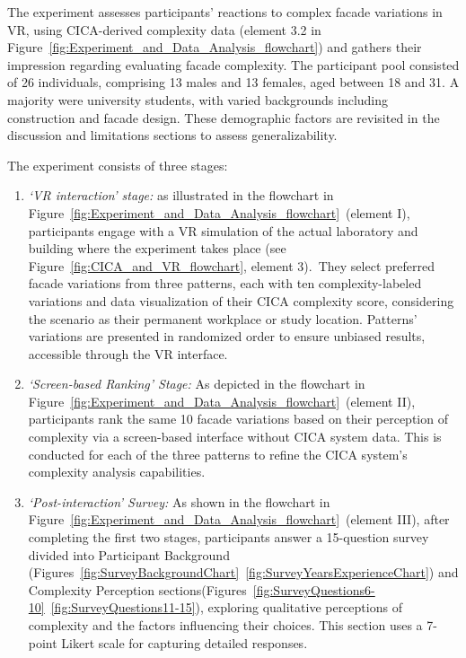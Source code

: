 %    

The experiment assesses participants' reactions to complex facade variations in VR, using CICA-derived complexity data (element 3.2 in Figure~\ref{fig:Experiment_and_Data_Analysis_flowchart}) and gathers their impression regarding evaluating facade complexity.
The participant pool consisted of 26 individuals, comprising 13 males and 13 females, aged between 18 and 31. A majority were university students, with varied backgrounds including construction and facade design. These demographic factors are revisited in the discussion and limitations sections to assess generalizability.

The experiment consists of three stages:

\begin{enumerate}
    \item \textit{`VR interaction' stage:}  as illustrated in the flowchart in Figure~\ref{fig:Experiment_and_Data_Analysis_flowchart}~(element I), participants engage with a VR simulation of the actual laboratory and building where the experiment takes place (see Figure~\ref{fig:CICA_and_VR_flowchart}, element 3).~They select preferred facade variations from three patterns, each with ten complexity-labeled variations and data visualization of their CICA complexity score, considering the scenario as their permanent workplace or study location.
    Patterns' variations are presented in randomized order to ensure unbiased results, accessible through the VR interface.

    \item \textit{`Screen-based Ranking' Stage:} As depicted in the flowchart in Figure~\ref{fig:Experiment_and_Data_Analysis_flowchart}~(element II), participants rank the same 10 facade variations based on their perception of complexity via a screen-based interface without CICA system data.
    This is conducted for each of the three patterns to refine the CICA system's complexity analysis capabilities.

    \item \textit{`Post-interaction' Survey:} As shown in the flowchart in Figure~\ref{fig:Experiment_and_Data_Analysis_flowchart}~(element III), after completing the first two stages, participants answer a 15-question survey divided into Participant Background (Figures~\ref{fig:SurveyBackgroundChart}~\ref{fig:SurveyYearsExperienceChart}) and Complexity Perception sections(Figures~\ref{fig:SurveyQuestions6-10}~\ref{fig:SurveyQuestions11-15}), exploring qualitative perceptions of complexity and the factors influencing their choices.
    This section uses a 7-point Likert scale for capturing detailed responses.
\end{enumerate}

